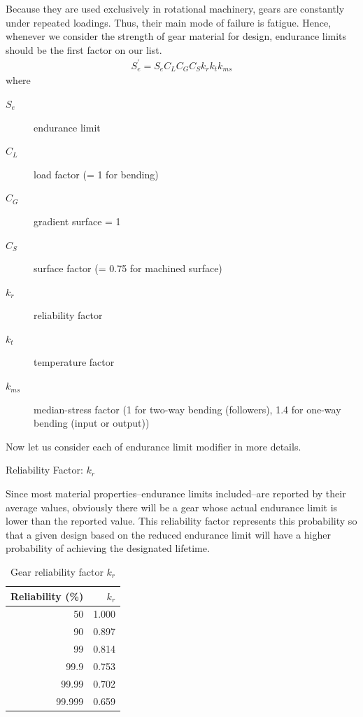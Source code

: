 \documentclass[a4paper,openany]{kaobook}
\begin{document}
Because they are used exclusively in rotational machinery, gears are constantly under repeated loadings. Thus, their main mode of failure is fatigue. Hence, whenever we consider the strength of gear material for design, endurance limits should be the first factor on our list.
\begin{align}
  S_{e}^{\prime} = S_{e}C_{L}C_{G}C_{S}k_{r}k_{t}k_{ms}
\end{align}
where

\begin{description}
\item[{\(S_{e}\)}] endurance limit

\item[{\(C_{L}\)}] load factor (= 1 for bending)

\item[{\(C_{G}\)}] gradient surface = 1

\item[{\(C_{S}\)}] surface factor (= 0.75 for machined surface)

\item[{\(k_{r}\)}] reliability factor

\item[{\(k_{t}\)}] temperature factor

\item[{\(k_{ms}\)}] median-stress factor (1 for two-way bending (followers), 1.4 for one-way bending (input or output))
\end{description}

Now let us consider each of endurance limit modifier in more details.

Reliability Factor: \(k_{r}\)

Since most material properties--endurance limits included--are reported by their average values, obviously there will be a gear whose actual endurance limit is lower than the reported value. This reliability factor represents this probability so that a given design based on the reduced endurance limit will have a higher probability of achieving the designated lifetime.

\begin{table}[htbp]
\caption{\label{tab: gear reliability factor}Gear reliability factor \(k_r\)}
\centering
\begin{tabular}{rr}
\toprule
Reliability (\%) & \(k_{r}\)\\
\midrule
50 & 1.000\\
90 & 0.897\\
99 & 0.814\\
99.9 & 0.753\\
99.99 & 0.702\\
99.999 & 0.659\\
\bottomrule
\end{tabular}
\end{table}
\end{document}
